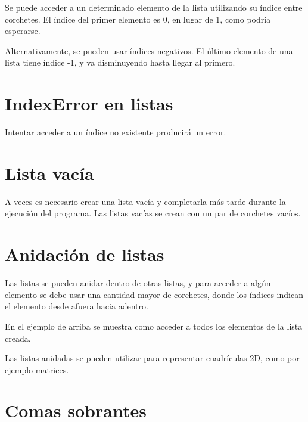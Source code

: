 \documentclass{report}
\begin{document}
Se puede acceder a un determinado elemento de la lista utilizando su índice entre corchetes. El índice del primer elemento es 0, en lugar de 1, como podría esperarse.


Alternativamente, se pueden usar índices negativos. El último elemento de una lista tiene índice -1, y va disminuyendo hasta llegar al primero.


\section{IndexError en listas}

Intentar acceder a un índice no existente producirá un error.


\section{Lista vacía}

A veces es necesario crear una lista vacía y completarla más tarde durante la ejecución del programa. Las listas vacías se crean con un par de corchetes vacíos.


\section{Anidación de listas}

Las listas se pueden anidar dentro de otras listas, y para acceder a algún elemento se debe usar una cantidad mayor de corchetes, donde los índices indican el elemento desde afuera hacia adentro.


En el ejemplo de arriba se muestra como acceder a todos los elementos de la lista creada.

Las listas anidadas se pueden utilizar para representar cuadrículas 2D, como por ejemplo matrices.


\section{Comas sobrantes}
\end{document}
